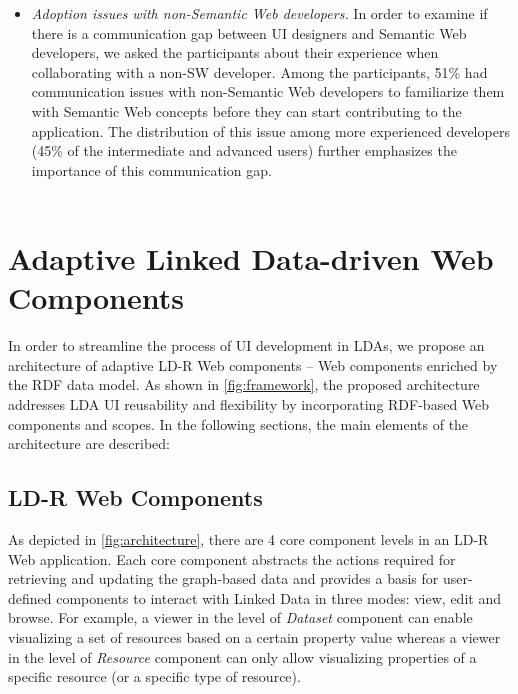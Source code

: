 \documentclass{acm_proc_article-sp}
\begin{document}
\begin{itemize}
\item
\emph{Adoption issues with non-Semantic Web developers.}
In order to examine if there is a communication gap between UI designers and Semantic Web developers, we asked the participants about their experience when collaborating with a non-SW developer.
Among the participants, 51\% had communication issues with non-Semantic Web developers to familiarize them with Semantic Web concepts before they can start contributing to the application.
The distribution of this issue among more experienced developers (45\% of the intermediate and advanced users) further emphasizes the importance of this communication gap.\\~\\

\end{itemize}

\section{Adaptive Linked Data-driven Web Components}
In order to streamline the process of UI development in LDAs, we propose an architecture of adaptive LD-R Web components -- Web components enriched by the RDF data model.
As shown in \autoref{fig:framework}, the proposed architecture addresses LDA UI reusability and flexibility by incorporating RDF-based Web components and scopes.
In the following sections, the main elements of the architecture are described:

\subsection{LD-R Web Components}
As depicted in \autoref{fig:architecture}, there are 4 core component levels in an LD-R Web application.
Each core component abstracts the actions required for retrieving and updating the graph-based data and provides a basis for user-defined components to interact with Linked Data in three modes: view, edit and browse.
For example, a viewer in the level of \emph{Dataset} component can enable visualizing a set of resources based on a certain property value whereas a viewer in the level of \emph{Resource} component can only allow visualizing properties of a specific resource (or a specific type of resource).
\end{document}
